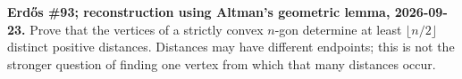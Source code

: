 \textbf{Erd\H{o}s \#93; reconstruction using Altman's geometric lemma, 2026-09-23.}
Prove that the vertices of a strictly convex $n$-gon determine at least $\lfloor n/2\rfloor$ distinct positive distances. Distances may have different endpoints; this is not the stronger question of finding one vertex from which that many distances occur.
